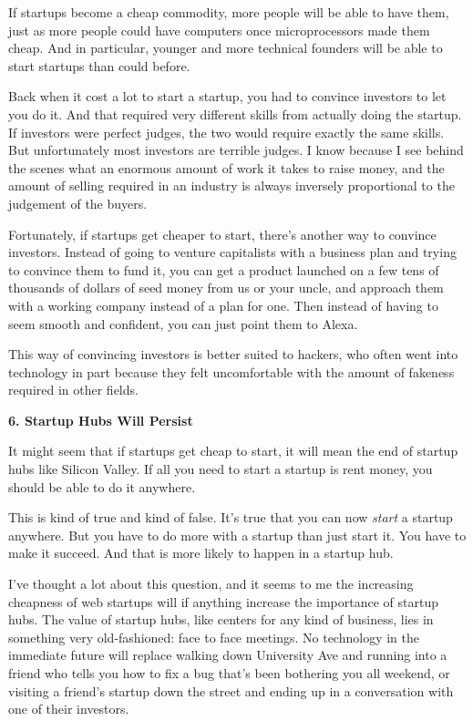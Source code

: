 \documentclass[12pt]{book}
\begin{document}
If startups become a cheap commodity, more people will be able to have
them, just as more people could have computers once microprocessors made
them cheap. And in particular, younger and more technical founders will
be able to start startups than could before.

Back when it cost a lot to start a startup, you had to convince
investors to let you do it. And that required very different skills from
actually doing the startup. If investors were perfect judges, the two
would require exactly the same skills. But unfortunately most investors
are terrible judges. I know because I see behind the scenes what an
enormous amount of work it takes to raise money, and the amount of
selling required in an industry is always inversely proportional to the
judgement of the buyers.

Fortunately, if startups get cheaper to start, there's another way to
convince investors. Instead of going to venture capitalists with a
business plan and trying to convince them to fund it, you can get a
product launched on a few tens of thousands of dollars of seed money
from us or your uncle, and approach them with a working company instead
of a plan for one. Then instead of having to seem smooth and confident,
you can just point them to Alexa.

This way of convincing investors is better suited to hackers, who often
went into technology in part because they felt uncomfortable with the
amount of fakeness required in other fields.

\textbf{6. Startup Hubs Will Persist}

It might seem that if startups get cheap to start, it will mean the end
of startup hubs like Silicon Valley. If all you need to start a startup
is rent money, you should be able to do it anywhere.

This is kind of true and kind of false. It's true that you can now
\emph{start} a startup anywhere. But you have to do more with a startup
than just start it. You have to make it succeed. And that is more likely
to happen in a startup hub.

I've thought a lot about this question, and it seems to me the
increasing cheapness of web startups will if anything increase the
importance of startup hubs. The value of startup hubs, like centers for
any kind of business, lies in something very old-fashioned: face to face
meetings. No technology in the immediate future will replace walking
down University Ave and running into a friend who tells you how to fix a
bug that's been bothering you all weekend, or visiting a friend's
startup down the street and ending up in a conversation with one of
their investors.
\end{document}
